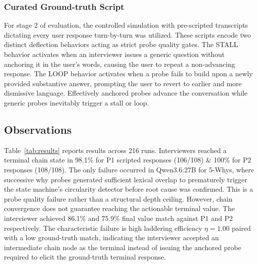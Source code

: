 \documentclass[sigconf,authordraft]{acmart}
\begin{document}

\subsubsection{Curated Ground-truth Script}
For stage 2 of evaluation, the controlled simulation with pre-scripted transcripts dictating every user response turn-by-turn was utilized. These scripts encode two distinct deflection behaviors acting as strict probe quality gates. The STALL behavior activates when an interviewer issues a generic question without anchoring it in the user's words, causing the user to repeat a non-advancing response. The LOOP behavior activates when a probe fails to build upon a newly provided substantive answer, prompting the user to revert to earlier and more dismissive language. Effectively anchored probes advance the conversation while generic probes inevitably trigger a stall or loop. 

\subsection{Observations}
Table~\ref{tab:results} reports results across 216 runs. Interviewers reached a terminal chain state in 98.1\% for P1 scripted responses (106/108) \& 100\% for P2 responses (108/108). The only failure occurred in Qwen3.6:27B for 5-Whys, where successive why probes generated sufficient lexical overlap to prematurely trigger the state machine's circularity detector before root cause was confirmed. This is a probe quality failure rather than a structural depth ceiling. However, chain convergence does not guarantee reaching the actionable terminal value. The interviewer achieved 86.1\% and 75.9\% final value match against P1 and P2 respectively. The characteristic failure is high laddering efficiency $\eta=1.00$ paired with a low ground-truth match, indicating the interviewer accepted an intermediate chain node as the terminal instead of issuing the anchored probe required to elicit the ground-truth terminal response.
\end{document}
